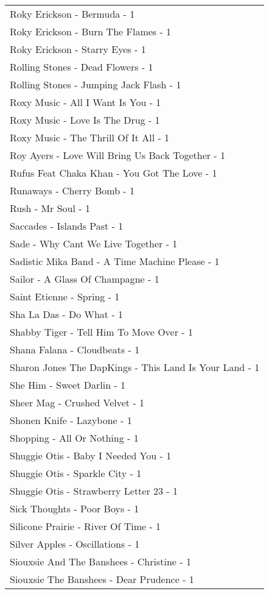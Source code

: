 \documentclass[
]{article}
\begin{document}
\begin{longtable}{l}
Roky Erickson - Bermuda - 1 \\ 
Roky Erickson - Burn The Flames - 1 \\ 
Roky Erickson - Starry Eyes - 1 \\ 
Rolling Stones - Dead Flowers - 1 \\ 
Rolling Stones - Jumping Jack Flash - 1 \\ 
Roxy Music - All I Want Is You - 1 \\ 
Roxy Music - Love Is The Drug - 1 \\ 
Roxy Music - The Thrill Of It All - 1 \\ 
Roy Ayers - Love Will Bring Us Back Together - 1 \\ 
Rufus Feat Chaka Khan - You Got The Love - 1 \\ 
Runaways - Cherry Bomb - 1 \\ 
Rush - Mr Soul - 1 \\ 
Saccades - Islands Past - 1 \\ 
Sade - Why Cant We Live Together - 1 \\ 
Sadistic Mika Band - A Time Machine Please - 1 \\ 
Sailor - A Glass Of Champagne - 1 \\ 
Saint Etienne - Spring - 1 \\ 
Sha La Das - Do What - 1 \\ 
Shabby Tiger - Tell Him To Move Over - 1 \\ 
Shana Falana - Cloudbeats - 1 \\ 
Sharon Jones The DapKings - This Land Is Your Land - 1 \\ 
She Him - Sweet Darlin - 1 \\ 
Sheer Mag - Crushed Velvet - 1 \\ 
Shonen Knife - Lazybone - 1 \\ 
Shopping - All Or Nothing - 1 \\ 
Shuggie Otis - Baby I Needed You - 1 \\ 
Shuggie Otis - Sparkle City - 1 \\ 
Shuggie Otis - Strawberry Letter 23 - 1 \\ 
Sick Thoughts - Poor Boys - 1 \\ 
Silicone Prairie - River Of Time - 1 \\ 
Silver Apples - Oscillations - 1 \\ 
Siouxsie And The Banshees - Christine - 1 \\ 
Siouxsie The Banshees - Dear Prudence - 1 \\ 

\end{longtable}
\end{document}
